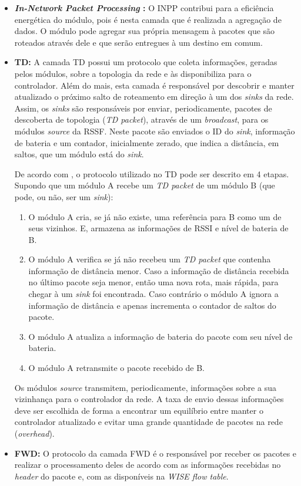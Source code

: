\begin{itemize} 
  \item \textbf{\textit{In-Network Packet Processing} :} O \ac{INPP} contribui para a eficiência energética do módulo, pois é nesta camada que é realizada a agregação de dados. O módulo pode agregar sua própria mensagem à pacotes que são roteados através dele e que serão entregues à um destino em comum. 
  \item \textbf{\ac{TD}:} A camada \ac{TD} possui um protocolo que coleta informações, geradas pelos módulos, sobre a topologia da rede e às disponibiliza para o controlador. Além do mais, esta camada é responsável por descobrir e manter atualizado o próximo salto de roteamento em direção à um dos \textit{sinks} da rede. Assim, os \textit{sinks} são responsáveis por enviar, periodicamente, pacotes de descoberta de topologia (\textit{TD packet}), através de um \textit{broadcast}, para os módulos \textit{source} da \ac{RSSF}. Neste pacote são enviados o \ac{ID} do \textit{sink}, informação de bateria e um contador, inicialmente zerado, que indica a distância, em saltos, que um módulo está do \textit{sink}.
  
  De acordo com , o protocolo utilizado no \ac{TD} pode ser descrito em 4 etapas. Supondo que um módulo A recebe um \textit{TD packet} de um módulo B (que pode, ou não, ser um \textit{sink}):
  \begin{enumerate}
    \item O módulo A cria, se já não existe, uma referência para B como um de seus vizinhos. E, armazena as informações de \ac{RSSI} e nível de bateria de B.
    \item O módulo A verifica se já não recebeu um \textit{TD packet} que contenha informação de distância menor. Caso a informação de distância recebida no último pacote seja menor, então uma nova rota, mais rápida, para chegar à um \textit{sink} foi encontrada. Caso contrário o módulo A ignora a informação de distância e apenas incrementa o contador de saltos do pacote.
    \item O módulo A atualiza a informação de bateria do pacote com seu nível de bateria.
    \item O módulo A retransmite o pacote recebido de B.
  \end{enumerate}

Os módulos \textit{source} transmitem, periodicamente, informações sobre a sua vizinhança para o controlador da rede. A taxa de envio dessas informações deve ser escolhida de forma a encontrar um equilíbrio entre manter o controlador atualizado e evitar uma grande quantidade de pacotes na rede (\textit{overhead}). 

    \item \textbf{\ac{FWD}:} O protocolo da camada \ac{FWD} é o responsável por receber os pacotes e realizar o processamento deles de acordo com as informações recebidas no \textit{header} do pacote e, com as disponíveis na \textit{WISE flow table}.
\end{itemize}

